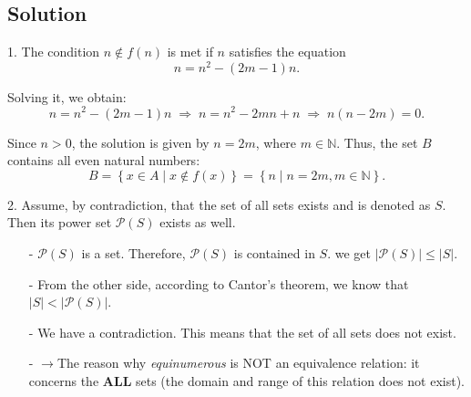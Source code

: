 \documentclass[12pt]{article}
\begin{document}
\subsection{Solution}
	1. The condition $n \notin f(n)$ is met if $n$ satisfies the equation
	\begin{equation*}
	n = {n^2} - \left( {2m - 1} \right)n.
	\end{equation*}
	\par Solving it, we obtain:
	\begin{equation*}
	{n = {n^2} - \left( {2m - 1} \right)n} \; \Rightarrow \; {n = {n^2} - 2mn + n} \;  \Rightarrow \; {n\left( {n - 2m} \right) = 0.}
	\end{equation*}
	\par Since $n > 0$, the solution is given by $n = 2m$, where $m \in \mathbb{N}$.
	Thus, the set $B$ contains all even natural numbers: $${B = \left\{ {x \in A \mid x \notin f\left( x \right)} \right\} }={ \left\{ n \mid n = 2m, m \in \mathbb{N} \right\}.}$$
	\par 
	2. Assume, by contradiction, that the set of all sets exists and is denoted as $S$. Then its power set $\mathcal{P}(S)$ exists as well.
	\begin{itemize}
		\item[-]$\mathcal{P}(S)$ is a set. Therefore, $\mathcal{P}(S)$ is contained in $S$. we get $\left| \mathcal{P}\left( S \right)\right| \leqslant \left|S\right|.$
		\item[-]From the other side, according to Cantor’s theorem, we know that $\left|S\right| < \left|\mathcal{P}\left( S \right)\right|.$
		\item[-]We have a contradiction. This means that the set of all sets does not exist.
		\item[-]$\to$The reason why \textit{equinumerous} is NOT an equivalence relation: it concerns the \textbf{ALL} sets (the domain and range of this relation does not exist).
	\end{itemize}
	\par 
\end{document}
